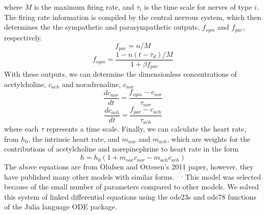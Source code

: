 \documentclass[12pt]{article}
\begin{document}
where $M$ is the maximum firing rate, and $\tau_i$ is the time scale for nerves of type $i$. 
The firing rate information is compiled by the central nervous system, which then determines the the sympathetic and parasympathetic outputs, $f_{sym}$ and $f_{par}$, respectively. 
\begin{equation}
f_{par} = n/M
\end{equation}
\begin{equation}
f_{sym} = \frac{1-n(t-\tau_d)/M}{1+\beta f_{par}}
\end{equation}
With these outputs, we can determine the dimensionless concentrations of acetylcholine, $c_{ach}$ and noradrenaline, $c_{nor}$
\begin{equation}
\label{dcnordt}
\frac{dc_{nor}}{dt} = \frac{f_{sym}-c_{nor}}{\tau_{nor}}
\end{equation}
\begin{equation}
\label{dcachdt}
\frac{dc_{ach}}{dt} = \frac{f_{par}-c_{ach}}{\tau_{ach}}
\end{equation}
where each $\tau$ represents a time scale. 
Finally, we can calculate the heart rate, from $h_0$, the intrinsic heart rate, and $m_{nor}$ and $m_{ach}$, which are weights for the contributions of acetylcholine and norepinephrine  to heart rate in the form
\begin{equation}
\label{h}
h = h_0(1+m_{nor}c_{nor} - m_{ach}c_{ach})
\end{equation}
The above equations are from Olufsen and Ottesen's 2011 paper, however, they have published many other models with similar forms.\citep{olufsen2006modeling} $^,$ \citep{ottesen1997modelling} $^,$ \citep{olufsen2008modeling} This model was selected because of the small number of parameters compared to other models. We solved this system of linked differential equations using the ode23s and ode78 functions of the Julia language ODE package. 
\end{document}
